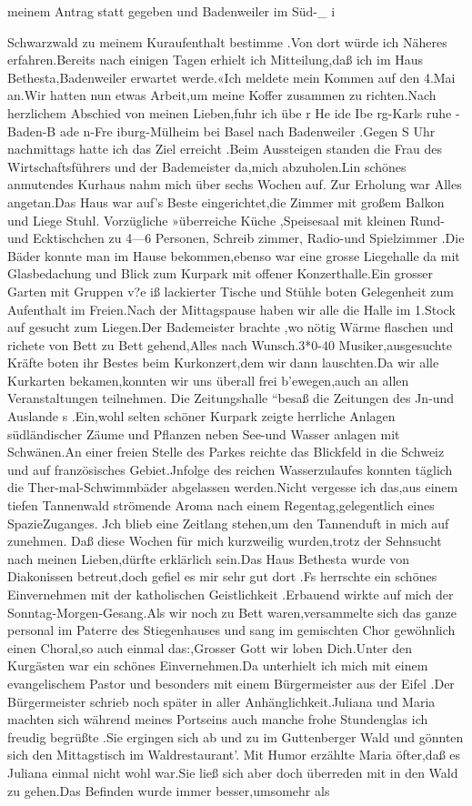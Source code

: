 \documentclass[a4paper,11pt]{article}
\begin{document}
meinem Antrag statt gegeben und Badenweiler im Süd-_	i

Schwarzwald zu meinem Kuraufenthalt bestimme .Von dort würde ich Näheres erfahren.Bereits nach einigen Tagen erhielt ich Mitteilung,daß ich im Haus Bethesta,Badenweiler erwartet werde.«Ich meldete mein Kommen auf den 4.Mai an.Wir hatten nun etwas Arbeit,um meine Koffer zusammen zu richten.Nach herzlichem Abschied von meinen Lieben,fuhr ich übe r He ide Ibe rg-Karls ruhe -Baden-B ade n-Fre iburg-Mülheim bei Basel nach Badenweiler .Gegen S Uhr nachmittags hatte ich das Ziel erreicht .Beim Aussteigen standen die Frau des Wirtschaftsführers und der Bademeister da,mich abzuholen.Lin schönes anmutendes Kurhaus nahm mich über sechs Wochen auf. Zur Erholung war Alles angetan.Das Haus war auf’s Beste eingerichtet,die Zimmer mit großem Balkon und Liege Stuhl. Vorzügliche »überreiche Küche ,Speisesaal mit kleinen Rund-und Ecktischchen zu 4—6 Personen, Schreib zimmer, Radio-und Spielzimmer .Die Bäder konnte man im Hause bekommen,ebenso war eine grosse Liegehalle da mit Glasbedachung und Blick zum Kurpark mit offener Konzerthalle.Ein grosser Garten mit Gruppen v?e iß lackierter Tische und Stühle boten Gelegenheit zum Aufenthalt im Freien.Nach der Mittagspause haben wir alle die Halle im 1.Stock auf gesucht zum Liegen.Der Bademeister brachte ,wo nötig Wärme flaschen und richete von Bett zu Bett gehend,Alles nach Wunsch.3*0-40 Musiker,ausgesuchte Kräfte boten ihr Bestes beim Kurkonzert,dem wir dann lauschten.Da wir alle Kurkarten bekamen,konnten wir uns überall frei b'ewegen,auch an allen Veranstaltungen teilnehmen. Die Zeitungshalle “besaß die Zeitungen des Jn-und Auslande s .Ein,wohl selten schöner Kurpark zeigte herrliche Anlagen südländischer Zäume und Pflanzen neben See-und Wasser anlagen mit Schwänen.An einer freien Stelle des Parkes reichte das Blickfeld in die Schweiz und auf französisches Gebiet.Jnfolge des reichen Wasserzulaufes konnten täglich die Ther-mal-Schwimmbäder abgelassen werden.Nicht vergesse ich das,aus einem tiefen Tannenwald strömende Aroma nach einem Regentag,gelegentlich eines SpazieZuganges. Jch blieb eine Zeitlang stehen,um den Tannenduft in mich auf zunehmen. Daß diese Wochen für mich kurzweilig wurden,trotz der Sehnsucht nach meinen Lieben,dürfte erklärlich sein.Das Haus Bethesta wurde von Diakonissen betreut,doch gefiel es mir sehr gut dort .Fs herrschte ein schönes Einvernehmen mit der katholischen Geistlichkeit .Erbauend wirkte auf mich der Sonntag-Morgen-Gesang.Als wir noch zu Bett waren,versammelte sich das ganze personal im Paterre des Stiegenhauses und sang im gemischten Chor gewöhnlich einen Choral,so auch einmal das:,Grosser Gott wir loben Dich.Unter den Kurgästen war ein schönes Einvernehmen.Da unterhielt ich mich mit einem evangelischem Pastor und besonders mit einem Bürgermeister aus der Eifel .Der Bürgermeister schrieb noch später in aller Anhänglichkeit.Juliana und Maria machten sich während meines Portseins auch manche frohe Stundenglas ich freudig begrüßte .Sie ergingen sich ab und zu im Guttenberger Wald und gönnten sich den Mittagstisch im Waldrestaurant’. Mit Humor erzählte Maria öfter,daß es Juliana einmal nicht wohl war.Sie ließ sich aber doch überreden mit in den Wald zu gehen.Das Befinden wurde immer besser,umsomehr als 
\end{document}
